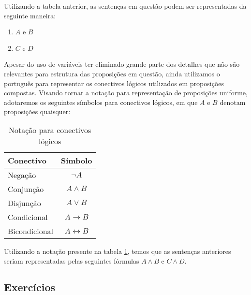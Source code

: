 Utilizando a tabela anterior, as senten\c{c}as em quest\~ao podem ser representadas da seguinte maneira:
\begin{enumerate}
  \item $A$ e $B$
  \item $C$ e $D$
\end{enumerate}
Apesar do uso de vari\'aveis ter eliminado grande parte dos detalhes que n\~ao s\~ao relevantes para estrutura das proposi\c{c}\~oes em quest\~ao,
ainda utilizamos o portugu\^es para representar os conectivos l\'ogicos utilizados em proposi\c{c}\~oes compostas. Visando tornar a nota\c{c}\~ao
para representa\c{c}\~ao de proposi\c{c}\~oes uniforme, adotaremos os seguintes s\'imbolos para conectivos l\'ogicos, em que $A$ e $B$ denotam
 proposi\c{c}\~oes quaisquer:
\begin{table}[h]
  \begin{tabular}{|l|c|}
    \hline
    Conectivo & S\'imbolo \\ \hline
    Nega\c{c}\~ao & $\neg A$ \\ \hline
    Conjun\c{c}\~ao & $A \land B$ \\ \hline
    Disjun\c{c}\~ao & $A \lor B$ \\ \hline
    Condicional & $A \to B$ \\ \hline
    Bicondicional & $A \leftrightarrow B$ \\ \hline
  \end{tabular}
  \centering
  \caption{Nota\c{c}\~ao para conectivos l\'ogicos}
  \label{table:2}
\end{table}

Utilizando a nota\c{c}\~ao presente na tabela \ref{table:2}, temos que as senten\c{c}as anteriores seriam representadas pelas seguintes f\'ormulas
$A \land B$  e $C \land D$.

\subsection{Exerc\'icios}

